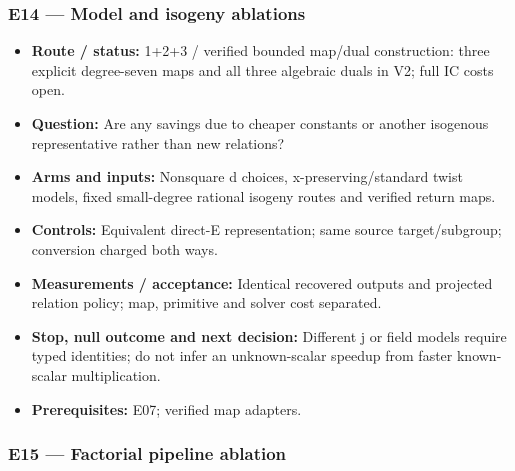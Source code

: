 \documentclass[
  10pt,
]{article}
\providecommand{\tightlist}{%
  \setlength{\itemsep}{0pt}\setlength{\parskip}{0pt}}
\begin{document}
\subsubsection{E14 --- Model and isogeny
ablations}\label{e14-model-and-isogeny-ablations}

\begin{itemize}
\tightlist
\item
  \textbf{Route / status:} 1+2+3 / verified bounded map/dual
  construction: three explicit degree-seven maps and all three algebraic
  duals in V2; full IC costs open.
\item
  \textbf{Question:} Are any savings due to cheaper constants or another
  isogenous representative rather than new relations?
\item
  \textbf{Arms and inputs:} Nonsquare d choices, x-preserving/standard
  twist models, fixed small-degree rational isogeny routes and verified
  return maps.
\item
  \textbf{Controls:} Equivalent direct-E representation; same source
  target/subgroup; conversion charged both ways.
\item
  \textbf{Measurements / acceptance:} Identical recovered outputs and
  projected relation policy; map, primitive and solver cost separated.
\item
  \textbf{Stop, null outcome and next decision:} Different j or field
  models require typed identities; do not infer an unknown-scalar
  speedup from faster known-scalar multiplication.
\item
  \textbf{Prerequisites:} E07; verified map adapters.
\end{itemize}

\subsubsection{E15 --- Factorial pipeline
ablation}\label{e15-factorial-pipeline-ablation}
\end{document}

